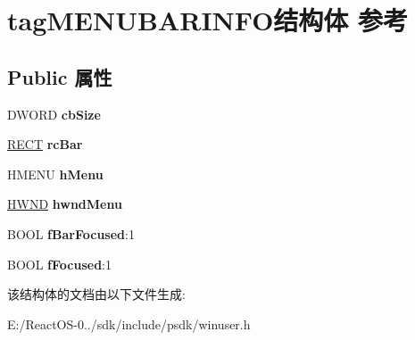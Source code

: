\hypertarget{structtag_m_e_n_u_b_a_r_i_n_f_o}{}\section{tag\+M\+E\+N\+U\+B\+A\+R\+I\+N\+F\+O结构体 参考}
\label{structtag_m_e_n_u_b_a_r_i_n_f_o}
\subsection*{Public 属性}
\begin{DoxyCompactItemize}
\item 
\mbox{\label{structtag_m_e_n_u_b_a_r_i_n_f_o_a69ea5daeaad02935aea2c8e9f1bd0748}} 
D\+W\+O\+RD {\bfseries cb\+Size}
\item 
\mbox{\label{structtag_m_e_n_u_b_a_r_i_n_f_o_af7c01c43e0443d0a36757a4caf53f398}} 
\hyperlink{structtag_r_e_c_t}{R\+E\+CT} {\bfseries rc\+Bar}
\item 
\mbox{\label{structtag_m_e_n_u_b_a_r_i_n_f_o_afa878fafa0d64b3e8bcba991a0fba44a}} 
H\+M\+E\+NU {\bfseries h\+Menu}
\item 
\mbox{\label{structtag_m_e_n_u_b_a_r_i_n_f_o_a315d1422a77e136f3a86cba171d2c3e1}} 
\hyperlink{interfacevoid}{H\+W\+ND} {\bfseries hwnd\+Menu}
\item 
\mbox{\label{structtag_m_e_n_u_b_a_r_i_n_f_o_a3eba3d04f48d1e7556e56e6b330b09bb}} 
B\+O\+OL {\bfseries f\+Bar\+Focused}\+:1
\item 
\mbox{\label{structtag_m_e_n_u_b_a_r_i_n_f_o_a26945dc808bca4aa16a11855394fe976}} 
B\+O\+OL {\bfseries f\+Focused}\+:1
\end{DoxyCompactItemize}


该结构体的文档由以下文件生成\+:\begin{DoxyCompactItemize}
\item 
E\+:/\+React\+O\+S-\/0../sdk/include/psdk/winuser.\+h\end{DoxyCompactItemize}
